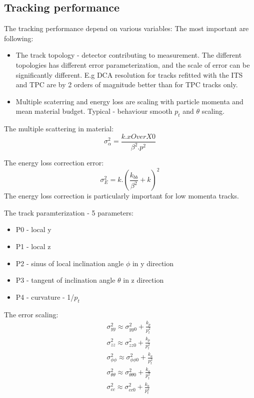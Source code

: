 \documentclass{elsart}
\begin{document}
\subsection{Tracking performance}


The tracking performance depend on various variables:
The most important are following:
\begin{itemize}
\item The track topology - detector contributing to measurement.
      The different topologies has different error parameterization, and the scale of error
      can be  significantly different. E.g DCA resolution for tracks refitted with the 
      ITS and TPC are by 2 orders of magnitude better than for TPC tracks only.
      
\item Multiple scaterring and energy loss are scaling with particle momenta and mean material budget.
      Typical -  behaviour smooth $p_{t}$ and $\theta$ scaling.
\end{itemize} 

The multiple scattering in material:
\begin{equation}
\sigma^2_\alpha=\frac{k. xOverX0}{\beta^2.p^2}
\end{equation}

The energy loss correction error:
\begin{equation}
\sigma^2_E= k. (\frac{k_{bb}}{\beta^2} + k)^2
\end{equation}
The energy loss correction is particularly important for low momenta tracks.


The track paramterization - 5 parameters:
\begin{itemize}
\item P0 - local y
\item P1 - local z
\item P2 - sinus   of local inclination angle $\phi$ in y direction
\item P3 - tangent of inclination angle $\theta$ in z direction
\item P4 - curvature  - 1/$p_t$
\end{itemize}

The error scaling:
\begin{equation}
\begin{split}
\sigma^2_{yy} \approx   \sigma^2_{yy0}+ \frac{k_p}{p^2_t} \\
\sigma^2_{zz} \approx   \sigma^2_{zz0}+ \frac{k_p}{p^2_t} \\
\sigma^2_{\phi\phi}     \approx  \sigma^2_{\phi\phi0}+ \frac{k_a}{p^2_t} \\
\sigma^2_{\theta\theta} \approx  \sigma^2_{\theta\theta0}+ \frac{k_a}{p^2_t} \\
\sigma^2_{cc} \approx  \sigma^2_{cc0}+ \frac{k_a}{p^4_t} \\
\end{split}
\end{equation}
\end{document}
